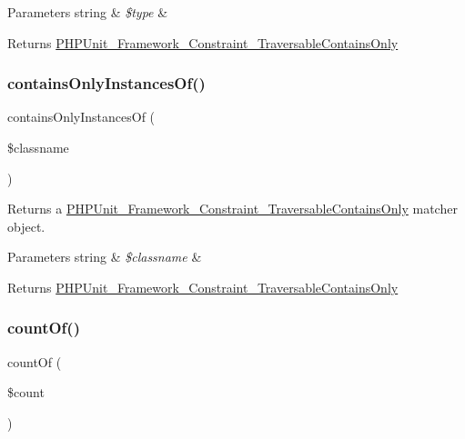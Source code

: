 \begin{DoxyParams}[1]{Parameters}
string & {\em \$type} & \\
\hline
\end{DoxyParams}
\begin{DoxyReturn}{Returns}
\mbox{\hyperlink{class_p_h_p_unit___framework___constraint___traversable_contains_only}{P\+H\+P\+Unit\+\_\+\+Framework\+\_\+\+Constraint\+\_\+\+Traversable\+Contains\+Only}} 
\end{DoxyReturn}
\mbox{\label{_functions_8php_a4ec7df260cbfd3cd90a21810031de03d}} 
\subsubsection{\texorpdfstring{contains\+Only\+Instances\+Of()}{containsOnlyInstancesOf()}}
{\footnotesize\ttfamily contains\+Only\+Instances\+Of (\begin{DoxyParamCaption}\item[{}]{\$classname }\end{DoxyParamCaption})}

Returns a \mbox{\hyperlink{class_p_h_p_unit___framework___constraint___traversable_contains_only}{P\+H\+P\+Unit\+\_\+\+Framework\+\_\+\+Constraint\+\_\+\+Traversable\+Contains\+Only}} matcher object.


\begin{DoxyParams}[1]{Parameters}
string & {\em \$classname} & \\
\hline
\end{DoxyParams}
\begin{DoxyReturn}{Returns}
\mbox{\hyperlink{class_p_h_p_unit___framework___constraint___traversable_contains_only}{P\+H\+P\+Unit\+\_\+\+Framework\+\_\+\+Constraint\+\_\+\+Traversable\+Contains\+Only}} 
\end{DoxyReturn}
\mbox{\label{_functions_8php_ac2f7f290c0baf2e861e29a1359d1b613}} 
\subsubsection{\texorpdfstring{count\+Of()}{countOf()}}
{\footnotesize\ttfamily count\+Of (\begin{DoxyParamCaption}\item[{}]{\$count }\end{DoxyParamCaption})}


